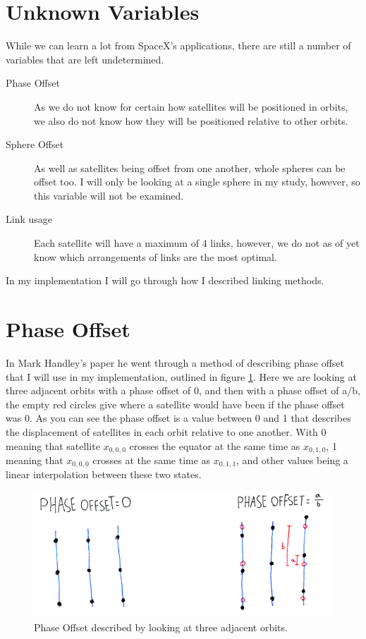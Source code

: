 \documentclass[12pt]{report}
\begin{document}
\section{Unknown Variables}
While we can learn a lot from SpaceX's applications, there are still a number of variables that are left undetermined. 

\begin{description}	
\item[Phase Offset]
As we do not know for certain how satellites will be positioned in orbits, we also do not know how they will be positioned relative to other orbits.
\item[Sphere Offset]
As well as satellites being offset from one another, whole spheres can be offset too. I will only be looking at a single sphere in my study, however, so this variable will not be examined.
\item[Link usage]
Each satellite will have a maximum of 4 links, however, we do not as of yet know which arrangements of links are the most optimal.
\end{description}

In my implementation I will go through how I described linking methods. 

\section{Phase Offset}
In Mark Handley's paper he went through a method of describing phase offset that I will use in my implementation, outlined in figure \ref{Phase Offset}. Here we are looking at three adjacent orbits with a phase offset of 0, and then with a phase offset of a/b, the empty red circles give where a satellite would have been if the phase offset was 0. As you can see the phase offset is a value between 0 and 1 that describes the displacement of satellites in each orbit relative to one another. With 0 meaning that satellite $x_{0,0,0}$ crosses the equator at the same time as $x_{0,1,0}$, 1 meaning that $x_{0,0,0}$ crosses at the same time as $x_{0,1,1}$, and other values being a linear interpolation between these two states.

\begin{figure}
	\caption{Phase Offset described by looking at three adjacent orbits.}
	\label{Phase Offset}
	\includegraphics[width=\textwidth]{PhaseOffset}
\end{figure}
\end{document}
